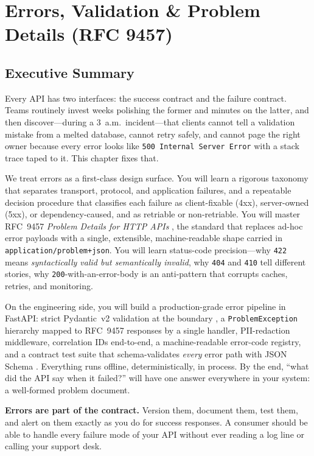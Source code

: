 \chapter{Errors, Validation \& Problem Details (RFC 9457)}
\label{ch:problem_details}

\section*{Executive Summary}

Every API has two interfaces: the success contract and the failure contract.
Teams routinely invest weeks polishing the former and minutes on the latter,
and then discover---during a 3~a.m.\ incident---that clients cannot tell a
validation mistake from a melted database, cannot retry safely, and cannot
page the right owner because every error looks like \texttt{500 Internal
Server Error} with a stack trace taped to it. This chapter fixes that.

We treat errors as a first-class design surface. You will learn a rigorous
taxonomy that separates transport, protocol, and application failures, and a
repeatable decision procedure that classifies each failure as client-fixable
(4xx), server-owned (5xx), or dependency-caused, and as retriable or
non-retriable. You will master RFC~9457 \emph{Problem Details for HTTP APIs}
\cite{rfc9457}, the standard that replaces ad-hoc error payloads with a
single, extensible, machine-readable shape carried in
\texttt{application/problem+json}. You will learn status-code precision---why
\texttt{422} means \emph{syntactically valid but semantically invalid}, why
\texttt{404} and \texttt{410} tell different stories, why
\texttt{200}-with-an-error-body is an anti-pattern that corrupts caches,
retries, and monitoring.

On the engineering side, you will build a production-grade error pipeline in
FastAPI: strict Pydantic~v2 validation at the boundary
\cite{pydanticdocs}, a \texttt{ProblemException} hierarchy mapped to RFC~9457
responses by a single handler, PII-redaction middleware, correlation IDs
end-to-end, a machine-readable error-code registry, and a contract test suite
that schema-validates \emph{every} error path with JSON Schema
\cite{jsonschemadocs}. Everything runs offline, deterministically, in
process. By the end, ``what did the API say when it failed?'' will have one
answer everywhere in your system: a well-formed problem document.

\begin{keyconceptbox}
\textbf{Errors are part of the contract.} Version them, document them, test
them, and alert on them exactly as you do for success responses. A consumer
should be able to handle every failure mode of your API without ever reading
a log line or calling your support desk.
\end{keyconceptbox}

